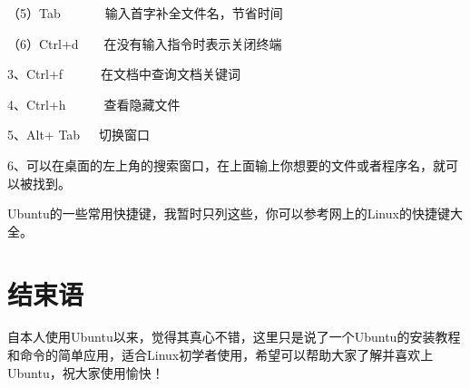 \documentclass{article}
\begin{document}
 （5）Tab~~~~~~~输入首字补全文件名，节省时间

  （6）Ctrl+d~~~~在没有输入指令时表示关闭终端

3、Ctrl+f~~~~~~在文档中查询文档关键词 
 
4、Ctrl+h~~~~~~查看隐藏文件

5、Alt+	Tab~~~切换窗口

6、可以在桌面的左上角的搜索窗口，在上面输上你想要的文件或者程序名，就可以被找到。

Ubuntu的一些常用快捷键，我暂时只列这些，你可以参考网上的Linux的快捷键大全。
\section{结束语}
自本人使用Ubuntu以来，觉得其真心不错，这里只是说了一个Ubuntu的安装教程和命令的简单应用，适合Linux初学者使用，希望可以帮助大家了解并喜欢上Ubuntu，祝大家使用愉快！
\end{document}
